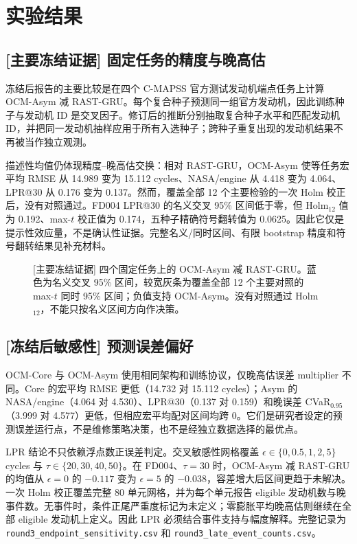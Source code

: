 
\FloatBarrier
\section{实验结果}

\subsection{[主要冻结证据] 固定任务的精度与晚高估}

冻结后报告的主要比较是在四个 C-MAPSS 官方测试发动机端点任务上计算 OCM-Asym 减 RAST-GRU。每个复合种子预测同一组官方发动机，因此训练种子与发动机 ID 是交叉因子。修订后的推断分别抽取复合种子水平和匹配发动机 ID，并把同一发动机抽样应用于所有入选种子；跨种子重复出现的发动机结果不再被当作独立观测。

描述性均值仍体现精度--晚高估交换：相对 RAST-GRU，OCM-Asym 使等任务宏平均 RMSE 从 14.989 变为 15.112 cycles、NASA/engine 从 4.418 变为 4.064、LPR@30 从 0.176 变为 0.137。然而，覆盖全部 12 个主要检验的一次 Holm 校正后，没有对照通过。FD004 LPR@30 的名义交叉 95\% 区间低于零，但 Holm$_{12}$ 值为 0.192、max-$t$ 校正值为 0.174，五种子精确符号翻转值为 0.0625。因此它仅是提示性效应量，不是确认性证据。完整名义/同时区间、有限 bootstrap 精度和符号翻转结果见补充材料。

\begin{figure}[!t]
\centering
{}
\caption{[主要冻结证据] 四个固定任务上的 OCM-Asym 减 RAST-GRU。蓝色为名义交叉 95\% 区间，较宽灰条为覆盖全部 12 个主要对照的 max-$t$ 同时 95\% 区间；负值支持 OCM-Asym。没有对照通过 Holm$_{12}$，不能只按名义区间方向作决策。}
\label{fig:round3-primary-crossed-zh}
\end{figure}
\FloatBarrier

\subsection{[冻结后敏感性] 预测误差偏好}

OCM-Core 与 OCM-Asym 使用相同架构和训练协议，仅晚高估误差 multiplier 不同。Core 的宏平均 RMSE 更低（14.732 对 15.112 cycles）；Asym 的 NASA/engine（4.064 对 4.530）、LPR@30（0.137 对 0.159）和晚误差 CVaR$_{0.95}$（3.999 对 4.577）更低，但相应宏平均配对区间均跨 0。它们是研究者设定的预测误差运行点，不是维修策略决策，也不是经独立数据选择的最优点。



LPR 结论不只依赖浮点数正误差判定。交叉敏感性网格覆盖 $\epsilon\in\{0,0.5,1,2,5\}$ cycles 与 $\tau\in\{20,30,40,50\}$。在 FD004、$\tau=30$ 时，OCM-Asym 减 RAST-GRU 的均值从 $\epsilon=0$ 的 $-0.117$ 变为 $\epsilon=5$ 的 $-0.038$，容差增大后区间更趋于未解决。一次 Holm 校正覆盖完整 80 单元网格，并为每个单元报告 eligible 发动机数与晚事件数。无事件时，条件正尾严重度标记为未定义；零膨胀平均晚高估则继续在全部 eligible 发动机上定义。因此 LPR 必须结合事件支持与幅度解释。完整记录为 \texttt{round3\_endpoint\_sensitivity.csv} 和 \texttt{round3\_late\_event\_counts.csv}。

